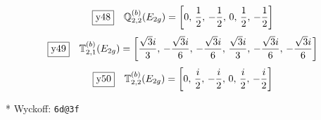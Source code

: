 \documentclass[fleqn,10pt,landscape]{jsarticle}
\begin{document}
\begin{dmath*}
\fbox{y48}\quad \mathbb{Q}_{2,2}^{(b)}(E_{2g})=\left[ 0,\, \frac{1}{2},\, - \frac{1}{2},\, 0,\, \frac{1}{2},\, - \frac{1}{2} \right]
\end{dmath*}
\begin{dmath*}
\fbox{y49}\quad \mathbb{T}_{2,1}^{(b)}(E_{2g})=\left[ \frac{\sqrt{3} i}{3},\, - \frac{\sqrt{3} i}{6},\, - \frac{\sqrt{3} i}{6},\, \frac{\sqrt{3} i}{3},\, - \frac{\sqrt{3} i}{6},\, - \frac{\sqrt{3} i}{6} \right]
\end{dmath*}
\begin{dmath*}
\fbox{y50}\quad \mathbb{T}_{2,2}^{(b)}(E_{2g})=\left[ 0,\, \frac{i}{2},\, - \frac{i}{2},\, 0,\, \frac{i}{2},\, - \frac{i}{2} \right]
\end{dmath*}
\vspace{5mm}

\noindent ** Wyckoff: \texttt{6d@3f}
\end{document}
